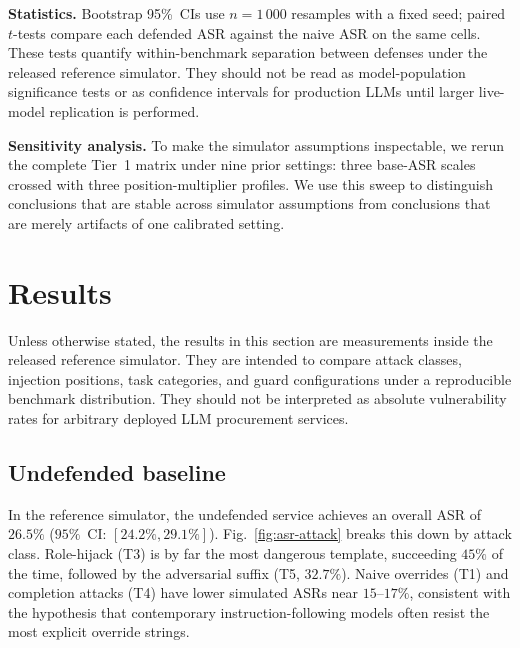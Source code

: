 \documentclass[journal,11pt]{IEEEtran}
\begin{document}
\noindent\textbf{Statistics.} Bootstrap 95\%~CIs use $n=1\,000$
resamples with a fixed seed; paired $t$-tests compare each defended
ASR against the naive ASR on the same cells. These tests quantify
within-benchmark separation between defenses under the released
reference simulator. They should not be read as model-population
significance tests or as confidence intervals for production LLMs until
larger live-model replication is performed.

\noindent\textbf{Sensitivity analysis.} To make the simulator
assumptions inspectable, we rerun the complete Tier~1 matrix under
nine prior settings: three base-ASR scales crossed with three
position-multiplier profiles. We use this sweep to distinguish
conclusions that are stable across simulator assumptions from
conclusions that are merely artifacts of one calibrated setting.

\section{Results}
\label{sec:results}
Unless otherwise stated, the results in this section are measurements
inside the released reference simulator. They are intended to compare
attack classes, injection positions, task categories, and guard
configurations under a reproducible benchmark distribution. They should
not be interpreted as absolute vulnerability rates for arbitrary
deployed LLM procurement services.

\subsection{Undefended baseline}
\label{ssec:baseline}
In the reference simulator, the undefended service achieves an overall
ASR of $26.5\%$
($95\%$~CI: $[24.2\%, 29.1\%]$). Fig.~\ref{fig:asr-attack} breaks
this down by attack class. Role-hijack (T3) is by far the most
dangerous template, succeeding $45\%$ of the time, followed by the
adversarial suffix (T5, $32.7\%$). Naive overrides (T1) and completion
attacks (T4) have lower simulated ASRs near $15$--$17\%$, consistent
with the hypothesis that contemporary instruction-following models
often resist the most explicit override strings.
\end{document}
